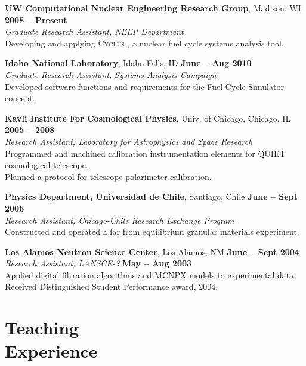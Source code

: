 \documentclass[margin,line]{resume}
\newcommand{\Cyclus}{\textsc{Cyclus }}
\begin{document}
\begin{resume}
    \textbf{UW Computational Nuclear Engineering Research Group}, Madison, WI \hfill \textbf{2008 -- Present}\\
		\textsl{Graduate Research Assistant, NEEP Department}\\ 
		Developing and applying \Cyclus, a nuclear fuel cycle systems analysis tool.

    \textbf{Idaho National Laboratory}, Idaho Falls, ID \hfill \textbf{June -- Aug 2010}\\
		\textsl{Graduate Research Assistant, Systems Analysis Campaign}\\ 
		Developed software functions and requirements for the Fuel Cycle Simulator concept.

    \textbf{Kavli Institute For Cosmological Physics}, Univ. of Chicago, Chicago, IL \hfill \textbf{2005 -- 2008}\\
                \textsl{Research Assistant, Laboratory for Astrophysics and Space Research}\\
                Programmed and machined calibration instrumentation elements for QUIET cosmological telescope.\\
                Planned a protocol for telescope polarimeter calibration.

    \textbf{Physics Department, Universidad de Chile}, Santiago, Chile \hfill \textbf{June -- Sept 2006}\\
                \textsl{Research Assistant, Chicago-Chile Research Exchange Program}\\
                 Constructed and operated a far from equilibrium granular materials experiment.

    \textbf{Los Alamos Neutron Science Center}, Los Alamos, NM \hfill \textbf{June -- Sept 2004}\\ 
                \textsl{Research Assistant, LANSCE-3} \hfill \textbf{May -- Aug 2003}\\
                Applied digital filtration algorithms and MCNPX models to experimental data.\\
		Received Distinguished Student Performance award, 2004.
    \section{\mysidestyle Teaching\\Experience}


\end{resume}
\end{document}
